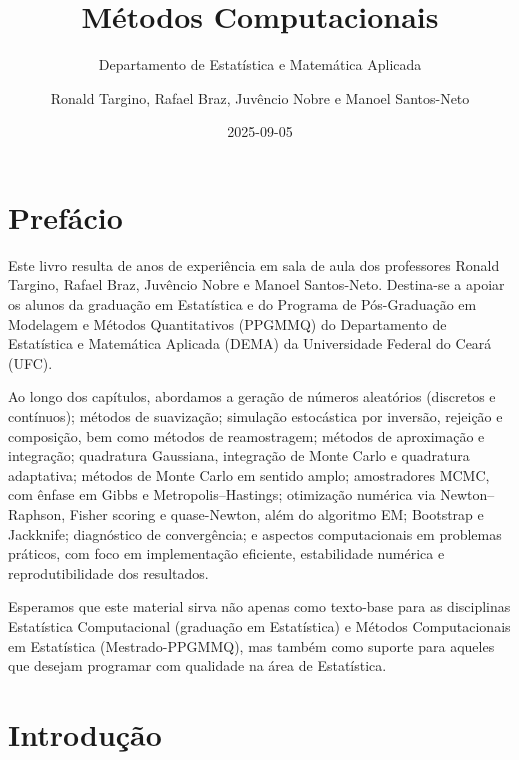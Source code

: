 \documentclass[
  letterpaper,
  DIV=11,
  numbers=noendperiod]{scrreprt}
\title{Métodos Computacionais}
\subtitle{Departamento de Estatística e Matemática Aplicada}
\author{Ronald Targino, Rafael Braz, Juvêncio Nobre e Manoel
Santos-Neto}
\date{2025-09-05}
\renewcommand*\contentsname{Índice}
\newcommand\contentsname{Índice}
\begin{document}
\maketitle

\renewcommand*\contentsname{Índice}
{
\hypersetup{linkcolor=}
\setcounter{tocdepth}{2}
\tableofcontents
}

\chapter*{Prefácio}\label{prefuxe1cio}


Este livro resulta de anos de experiência em sala de aula dos
professores Ronald Targino, Rafael Braz, Juvêncio Nobre e Manoel
Santos-Neto. Destina-se a apoiar os alunos da graduação em Estatística e
do Programa de Pós-Graduação em Modelagem e Métodos Quantitativos
(PPGMMQ) do Departamento de Estatística e Matemática Aplicada (DEMA) da
Universidade Federal do Ceará (UFC).

Ao longo dos capítulos, abordamos a geração de números aleatórios
(discretos e contínuos); métodos de suavização; simulação estocástica
por inversão, rejeição e composição, bem como métodos de reamostragem;
métodos de aproximação e integração; quadratura Gaussiana, integração de
Monte Carlo e quadratura adaptativa; métodos de Monte Carlo em sentido
amplo; amostradores MCMC, com ênfase em Gibbs e Metropolis--Hastings;
otimização numérica via Newton--Raphson, Fisher scoring e quase-Newton,
além do algoritmo EM; Bootstrap e Jackknife; diagnóstico de
convergência; e aspectos computacionais em problemas práticos, com foco
em implementação eficiente, estabilidade numérica e reprodutibilidade
dos resultados.

Esperamos que este material sirva não apenas como texto-base para as
disciplinas Estatística Computacional (graduação em Estatística) e
Métodos Computacionais em Estatística (Mestrado-PPGMMQ), mas também como
suporte para aqueles que desejam programar com qualidade na área de
Estatística.


\chapter{Introdução}\label{introduuxe7uxe3o}
\end{document}

